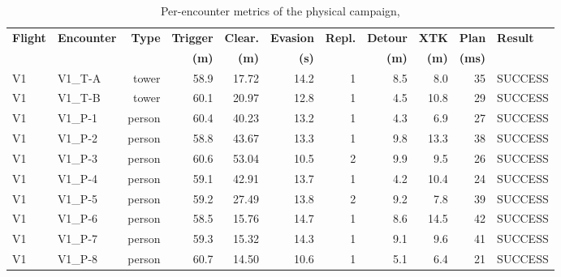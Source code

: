 \documentclass[electronics,article,submit,moreauthors]{Definitions/mdpi}
\DeclareRobustCommand{\added}[1]{#1}%
\DeclareRobustCommand{\added}[1]{\textcolor{green!50!black}{#1}}
\def\added#1{#1}%
\begin{document}
\begin{table}[H]
\centering
\caption{\added{Per-encounter metrics of the physical campaign, }}
\label{tab:physical_encounters}
\scriptsize
\begin{tabular}{llrrrrrrrrl}
\toprule
\textbf{Flight} & \textbf{Encounter} & \textbf{Type} & \textbf{Trigger} & \textbf{Clear.} & \textbf{Evasion} & \textbf{Repl.} & \textbf{Detour} & \textbf{XTK} & \textbf{Plan} & \textbf{Result} \\
& & & \textbf{(m)} & \textbf{(m)} & \textbf{(s)} & & \textbf{(m)} & \textbf{(m)} & \textbf{(ms)} & \\
\midrule
\added{V1} & \added{V1\_T-A} & \added{tower} & \added{58.9} & \added{17.72} & \added{14.2} & \added{1} & \added{8.5} & \added{8.0} & \added{35} & \added{SUCCESS} \\
\added{V1} & \added{V1\_T-B} & \added{tower} & \added{60.1} & \added{20.97} & \added{12.8} & \added{1} & \added{4.5} & \added{10.8} & \added{29} & \added{SUCCESS} \\
\added{V1} & \added{V1\_P-1} & \added{person} & \added{60.4} & \added{40.23} & \added{13.2} & \added{1} & \added{4.3} & \added{6.9} & \added{27} & \added{SUCCESS} \\
\added{V1} & \added{V1\_P-2} & \added{person} & \added{58.8} & \added{43.67} & \added{13.3} & \added{1} & \added{9.8} & \added{13.3} & \added{38} & \added{SUCCESS} \\
\added{V1} & \added{V1\_P-3} & \added{person} & \added{60.6} & \added{53.04} & \added{10.5} & \added{2} & \added{9.9} & \added{9.5} & \added{26} & \added{SUCCESS} \\
\added{V1} & \added{V1\_P-4} & \added{person} & \added{59.1} & \added{42.91} & \added{13.7} & \added{1} & \added{4.2} & \added{10.4} & \added{24} & \added{SUCCESS} \\
\added{V1} & \added{V1\_P-5} & \added{person} & \added{59.2} & \added{27.49} & \added{13.8} & \added{2} & \added{9.2} & \added{7.8} & \added{39} & \added{SUCCESS} \\
\added{V1} & \added{V1\_P-6} & \added{person} & \added{58.5} & \added{15.76} & \added{14.7} & \added{1} & \added{8.6} & \added{14.5} & \added{42} & \added{SUCCESS} \\
\added{V1} & \added{V1\_P-7} & \added{person} & \added{59.3} & \added{15.32} & \added{14.3} & \added{1} & \added{9.1} & \added{9.6} & \added{41} & \added{SUCCESS} \\
\added{V1} & \added{V1\_P-8} & \added{person} & \added{60.7} & \added{14.50} & \added{10.6} & \added{1} & \added{5.1} & \added{6.4} & \added{21} & \added{SUCCESS} \\

\end{tabular}
\end{table}
\end{document}
